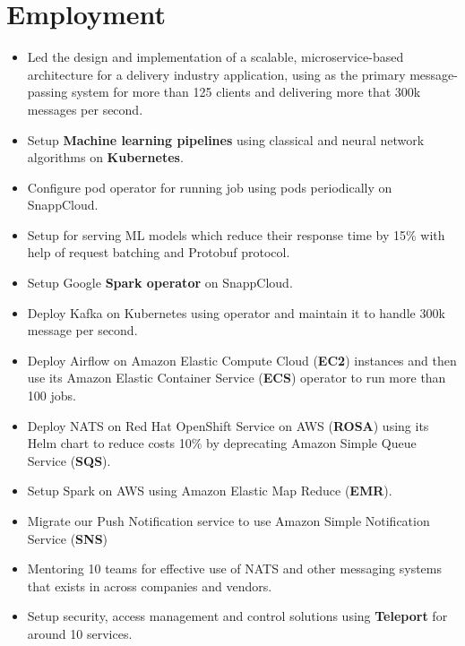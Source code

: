 \section{Employment}

\begin{itemize}
      \item Led the design and implementation of a scalable, microservice-based architecture for a delivery industry application,
            using  as the primary message-passing system for more than 125 clients and delivering
            more that 300k messages per second.
      \item Setup \textbf{Machine learning pipelines} using classical and neural network algorithms on \textbf{Kubernetes}.
      \item Configure  pod operator for running job using pods periodically on SnappCloud.
      \item Setup  for serving ML models which reduce their response time by 15\%
            with help of request batching and Protobuf protocol.
      \item Setup Google \textbf{Spark operator} on SnappCloud.
      \item Deploy Kafka on Kubernetes using  operator and maintain it to handle 300k message per second.
      \item Deploy Airflow on Amazon Elastic Compute Cloud (\textbf{EC2}) instances and then use
            its Amazon Elastic Container Service (\textbf{ECS}) operator
            to run more than 100 jobs.
      \item Deploy NATS on Red Hat OpenShift Service on AWS (\textbf{ROSA})
            using its Helm chart to reduce costs 10\% by deprecating Amazon Simple Queue Service (\textbf{SQS}).
      \item Setup Spark on AWS using Amazon Elastic Map Reduce (\textbf{EMR}).
      \item Migrate our Push Notification service to use Amazon Simple Notification Service (\textbf{SNS})
      \item Mentoring 10 teams for effective use of NATS and other messaging systems that exists in across companies and vendors.
      \item Setup security, access management and control solutions using \textbf{Teleport} for around 10 services.

\end{itemize}

